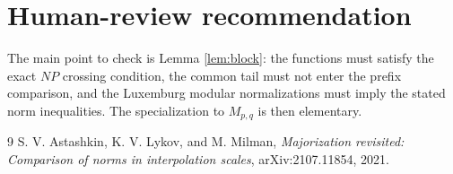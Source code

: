 \documentclass[11pt]{article}
\begin{document}
\section*{Human-review recommendation}

The main point to check is Lemma \ref{lem:block}: the functions must satisfy
the exact $NP$ crossing condition, the common tail must not enter the prefix
comparison, and the Luxemburg modular normalizations must imply the stated
norm inequalities. The specialization to $M_{p,q}$ is then elementary.

\begin{thebibliography}{9}
S. V. Astashkin, K. V. Lykov, and M. Milman,
\emph{Majorization revisited: Comparison of norms in interpolation scales},
arXiv:2107.11854, 2021.
\end{thebibliography}
\end{document}
